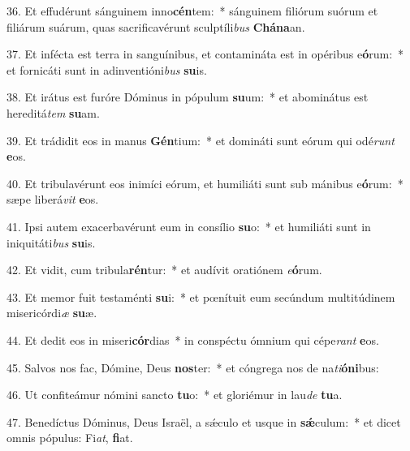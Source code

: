 36. Et effudérunt sánguinem inno\textbf{cén}tem:~*  sánguinem filiórum suórum et filiárum suárum, quas sacrificavérunt sculptíli\textit{bus} \textbf{Chá}\textbf{na}an.\

37. Et infécta est terra in sanguínibus, et contamináta est in opéribus e\textbf{ó}rum:~*  et fornicáti sunt in adinventióni\textit{bus} \textbf{su}is.\

38. Et irátus est furóre Dóminus in pópulum \textbf{su}um:~*  et abominátus est hereditá\textit{tem} \textbf{su}am.\

39. Et trádidit eos in manus \textbf{Gén}tium:~*  et domináti sunt eórum qui odé\textit{runt} \textbf{e}os.\

40. Et tribulavérunt eos inimíci eórum, et humiliáti sunt sub mánibus e\textbf{ó}rum:~*  sæpe liberá\textit{vit} \textbf{e}os.\

41. Ipsi autem exacerbavérunt eum in consílio \textbf{su}o:~*  et humiliáti sunt in iniquitáti\textit{bus} \textbf{su}is.\

42. Et vidit, cum tribula\textbf{rén}tur:~*  et audívit oratiónem \textit{e}\textbf{ó}rum.\

43. Et memor fuit testaménti \textbf{su}i:~*  et pœnítuit eum secúndum multitúdinem misericórdi\textit{æ} \textbf{su}æ.\

44. Et dedit eos in miseri\textbf{cór}dias~*  in conspéctu ómnium qui cépe\textit{rant} \textbf{e}os.\

45. Salvos nos fac, Dómine, Deus \textbf{nos}ter:~*  et cóngrega nos de na\textit{ti}\textbf{ó}\textbf{ni}bus:\

46. Ut confiteámur nómini sancto \textbf{tu}o:~*  et gloriémur in lau\textit{de} \textbf{tu}a.\

47. Benedíctus Dóminus, Deus Israël, a sǽculo et usque in \textbf{sǽ}culum:~*  et dicet omnis pópulus: Fi\textit{at}, \textbf{fi}at.\

